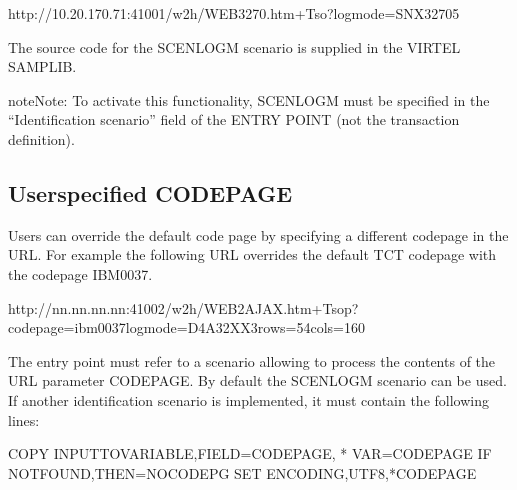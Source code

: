 \documentclass[letterpaper,10pt,english]{sphinxmanual}
\begin{document}
\begin{sphinxVerbatim}[commandchars=\\\{\}]
http://10.20.170.71:41001/w2h/WEB3270.htm+Tso?logmode=SNX32705
\end{sphinxVerbatim}

\sphinxAtStartPar
The source code for the SCENLOGM scenario is supplied in the VIRTEL SAMPLIB.

\begin{sphinxadmonition}{note}{Note:}
\sphinxAtStartPar
To activate this functionality, SCENLOGM must be specified in the “Identification scenario” field of the ENTRY POINT (not the transaction definition).
\end{sphinxadmonition}

\ignorespaces 

\subsection{User\sphinxhyphen{}specified CODEPAGE}
\label{\detokenize{Customization:user-specified-codepage}}\label{\detokenize{Customization:index-64}}
\sphinxAtStartPar
Users can override the default code page by specifying a different codepage in the URL. For example the following URL overrides the default TCT codepage with the codepage IBM0037.

\begin{sphinxVerbatim}[commandchars=\\\{\}]
http://nn.nn.nn.nn:41002/w2h/WEB2AJAX.htm+Tsop?codepage=ibm0037\PYGZam{}logmode=D4A32XX3\PYGZam{}rows=54\PYGZam{}cols=160
\end{sphinxVerbatim}

\sphinxAtStartPar
The entry point must refer to a scenario allowing to process the contents of the URL parameter CODEPAGE. By default the SCENLOGM scenario can be used. If another identification scenario is implemented, it must contain the following lines:

\begin{sphinxVerbatim}[commandchars=\\\{\}]
COPY\PYGZdl{} INPUT\PYGZhy{}TO\PYGZhy{}VARIABLE,FIELD=\PYGZsq{}CODEPAGE\PYGZsq{}, *
        VAR=\PYGZsq{}CODEPAGE\PYGZsq{}
IF\PYGZdl{} NOT\PYGZhy{}FOUND,THEN=NOCODEPG
SET\PYGZdl{} ENCODING,UTF\PYGZhy{}8,\PYGZsq{}*CODEPAGE\PYGZsq{}
\end{sphinxVerbatim}
\end{document}
